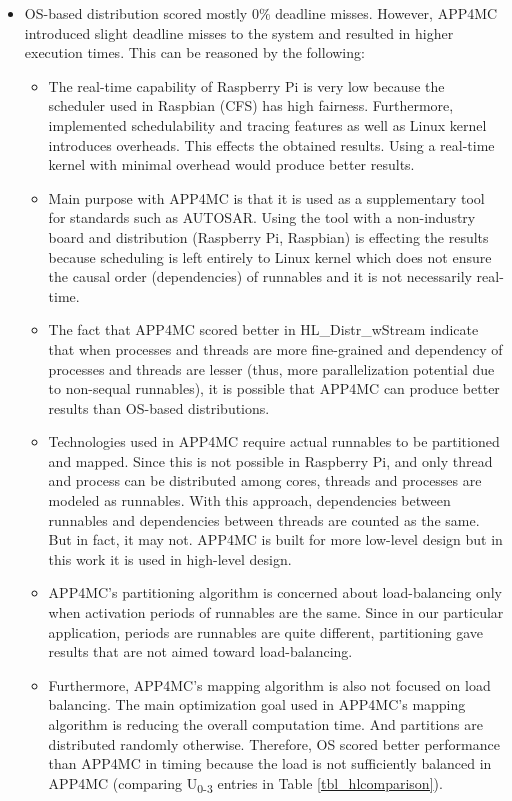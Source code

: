 \begin{itemize}
	\item OS-based distribution scored mostly 0\% deadline misses. However, APP4MC introduced slight deadline misses to the system and resulted in higher execution times. This can be reasoned by the following:
	\begin{itemize}
		\item The real-time capability of Raspberry Pi is very low because the scheduler used in Raspbian (CFS) has high fairness. Furthermore, implemented schedulability and tracing features as well as Linux kernel introduces overheads. This effects the  obtained results. Using a real-time kernel with minimal overhead would produce better results.
		\item Main purpose with APP4MC is that it is used as a supplementary tool for standards such as AUTOSAR. Using the tool with a non-industry board and distribution (Raspberry Pi, Raspbian) is effecting the results because scheduling is left entirely to Linux kernel which does not ensure the causal order (dependencies) of runnables and it is not necessarily real-time.
		\item The fact that APP4MC scored better in HL{\_}Distr{\_}wStream indicate that when processes and threads are more fine-grained and dependency of processes and threads are lesser (thus, more parallelization potential due to non-sequal runnables), it is possible that APP4MC can produce better results than OS-based distributions.
		\item Technologies used in APP4MC require actual runnables to be partitioned and mapped. Since this is not possible in Raspberry Pi, and only thread and process can be distributed among cores, threads and processes are modeled as runnables. With this approach, dependencies between runnables and dependencies between threads are counted as the same. But in fact, it may not. APP4MC is built for more low-level design but in this work it is used in high-level design.
		\item APP4MC's partitioning algorithm is concerned about load-balancing only when activation periods of runnables are the same. Since in our particular application, periods are runnables are quite different, partitioning gave results that are not aimed toward load-balancing.
		\item Furthermore, APP4MC's mapping algorithm is also not focused on load balancing. The main optimization goal used in APP4MC's mapping algorithm is reducing the overall computation time. And partitions are distributed randomly otherwise. Therefore, OS scored better performance than APP4MC in timing because the load is not sufficiently balanced in APP4MC (comparing U\textsubscript{0-3} entries in Table \ref{tbl_hlcomparison}).
	\end{itemize}
\end{itemize}

